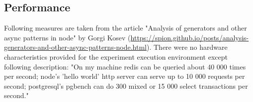 






\subsection{Performance}
\label{subsec:performance}
Following measures are taken from the article "Analysis of generators and other async patterns in node" by Gorgi Kosev (\url{https://spion.github.io/posts/analysis-generators-and-other-async-patterns-node.html}). There were no hardware characteristics provided for the experiment execution environment except following description\cite{asyncPerformance_2}: "On my machine redis can be queried about 40 000 times per second; node's 'hello world' http server can serve up to 10 000 requests per second; postgresql's pgbench can do 300 mixed or 15 000 select transactions per second." 


